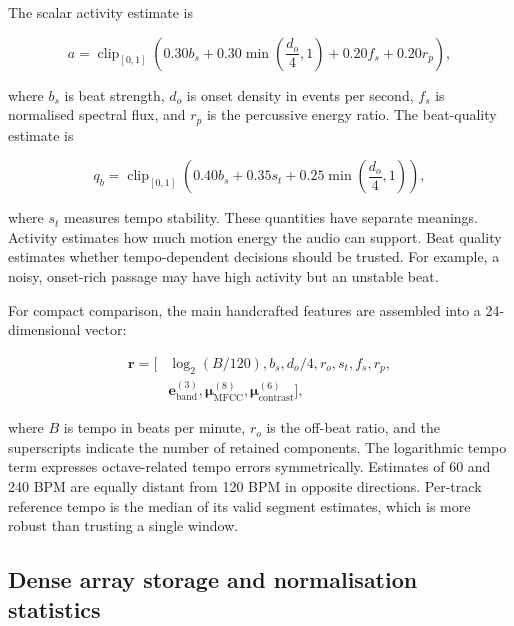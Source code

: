 The scalar activity estimate is

\begin{equation}
    a = \operatorname{clip}_{[0,1]}\!\left(
        0.30b_s
        +0.30\min\!\left(\frac{d_o}{4},1\right)
        +0.20f_s
        +0.20r_p
    \right),
    \label{eq:audio_activity}
\end{equation}

where $b_s$ is beat strength, $d_o$ is onset density in events per second,
$f_s$ is normalised spectral flux, and $r_p$ is the percussive energy ratio.
The beat-quality estimate is

\begin{equation}
    q_b = \operatorname{clip}_{[0,1]}\!\left(
        0.40b_s + 0.35s_t
        +0.25\min\!\left(\frac{d_o}{4},1\right)
    \right),
    \label{eq:beat_quality}
\end{equation}

where $s_t$ measures tempo stability. These quantities have separate meanings.
Activity estimates how much motion energy the audio can support. Beat quality
estimates whether tempo-dependent decisions should be trusted. For example, a
noisy, onset-rich passage may have high activity but an unstable beat.

For compact comparison, the main handcrafted features are assembled into a
24-dimensional vector:

\begin{equation}
\begin{split}
    \mathbf{r} = [
        &\log_2(B/120), b_s, d_o/4, r_o, s_t, f_s, r_p,\\
        &\mathbf{e}_{\mathrm{band}}^{(3)},
        \boldsymbol{\mu}_{\mathrm{MFCC}}^{(8)},
        \boldsymbol{\mu}_{\mathrm{contrast}}^{(6)}],
\end{split}
    \label{eq:rhythm_timbre_vector}
\end{equation}

where $B$ is tempo in beats per minute, $r_o$ is the off-beat ratio, and the
superscripts indicate the number of retained components. The logarithmic tempo
term expresses octave-related tempo errors symmetrically. Estimates of 60 and
240 BPM are equally distant from 120 BPM in opposite directions. Per-track
reference tempo is the median of its valid segment estimates, which is more
robust than trusting a single window.

\subsection{Dense array storage and normalisation statistics}
\label{subsec:audio_array_storage}

